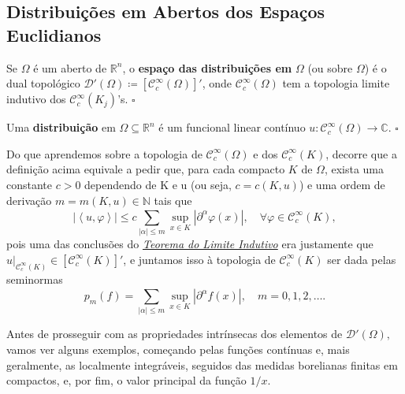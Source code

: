 \documentclass[../distribution_theory_notes.tex]{subfiles}
\begin{document}
  \subsection{Distribuições em Abertos dos Espaços Euclidianos}
 \begin{def*}
   Se \(\Omega \) é um aberto de \(\mathbb{R}^{n}\), o \textbf{espaço das distribuições em }\(\Omega \) (ou sobre \(\Omega \)) é o dual topológico \(\mathcal{D}'(\Omega )\coloneqq [\mathcal{C}_{c}^{\infty}(\Omega )]'\), onde \(\mathcal{C}_{c}^{\infty}(\Omega )\) tem a topologia limite indutivo dos \(\mathcal{C}_{c}^{\infty}(K_{j})\)'s. \(\square\)
 \end{def*}
 \begin{def*}
   Uma \textbf{distribuição} em \(\Omega \subseteq \mathbb{R}^{n}\) é um funcional linear contínuo \(u:\mathcal{C}_{c}^{\infty}(\Omega )\rightarrow \mathbb{C}\). \(\square\)
 \end{def*}
  Do que aprendemos sobre a topologia de \(\mathcal{C}_{c}^{\infty}(\Omega )\) e dos \(\mathcal{C}_{c}^{\infty}(K)\), decorre que a definição acima equivale a pedir que, para cada compacto \(K\) de \(\Omega \), exista uma constante \(c>0\) dependendo de K e u (ou seja, \(c=c(K, u)\)) e uma ordem de derivação \(m=m(K, u)\in \mathbb{N}\) tais que 
    \[
      | \left< u, \varphi  \right> |\leq c \sum\limits_{| \alpha  |\leq m}^{}\sup_{x\in K}| \partial ^{\alpha }\varphi (x) |,\quad \forall \varphi \in \mathcal{C}_{c}^{\infty}(K),
    \]
    pois uma das conclusões do \hyperlink{inductive_limit}{\textit{Teorema do Limite Indutivo}} era justamente que \(u|_{\mathcal{C}_{c}^{\infty}(K)}\in [\mathcal{C}_{c}^{\infty}(K)]'\), e juntamos isso à topologia de \(\mathcal{C}_{c}^{\infty}(K)\) ser dada pelas seminormas 
      \[
        p_{m}(f)=\sum\limits_{| \alpha  |\leq m}^{} \sup_{x\in K}| \partial ^{\alpha }f(x) |,\quad m=0,1,2,\dotsc .
      \]

      Antes de prosseguir com as propriedades intrínsecas dos elementos de \(\mathcal{D}'(\Omega ),\) vamos ver alguns exemplos, começando pelas funções contínuas e, mais geralmente, as localmente integráveis, seguidos das medidas borelianas finitas em compactos, e, por fim, o valor principal da função \(1/x\).
       
\end{document}
